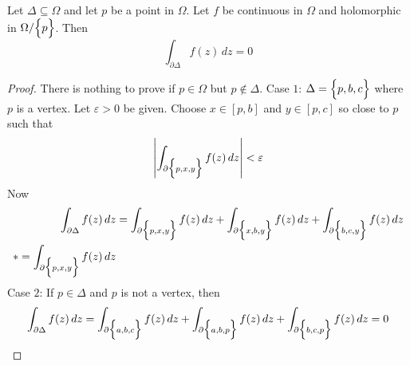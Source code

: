 \documentclass[12pt]{article}
\begin{document}
\begin{theorem} Let $\Delta \subseteq \Omega$ and let $p$ be a point in $\Omega$. Let $f$ be continuous in $\Omega$ and holomorphic in $\Omega/\Big\{ p \Big\}$. Then $$ \int_{\partial \Delta} f(z) \, dz = 0 $$ \end{theorem} 
\begin{proof} There is nothing to prove if $p \in \Omega$ but $p \not\in \Delta$. Case $1$: $\Delta = \Big\{ p,b,c \Big\}$ where $p$ is a vertex. Let $\varepsilon > 0$ be given. Choose $x \in [p,b]$ and $y \in [p,c]$ so close to $p$ such that $$ \abs{\int_{\partial \Big\{ p,x,y \Big\}} f(z) \, dz } < \varepsilon $$ Now $$ \begin{aligned} \int_{\partial \Delta} f(z) \, dz &= \int_{\partial \Big\{ p,x,y \Big\}} f(z) \, dz + \int_{\partial \Big\{ x,b,y \Big\}} f(z) \, dz + \int_{\partial \Big\{ b,c,y \Big\}} f(z) \, dz \\ *= \int_{\partial \Big\{ p,x,y \Big\}} f(z) \, dz \end{aligned} $$ 
Case $2$: If $p \in \Delta$ and $p$ is not a vertex, then $$ \int_{\partial \Delta} f(z) \, dz = \int_{\partial \Big\{ a,b,c \Big\}} f(z) \, dz + \int_{\partial \Big\{ a,b,p \Big\}} f(z) \, dz + \int_{\partial \Big\{ b,c,p \Big\}} f(z) \, dz = 0 $$ \end{proof} 
\end{document}
